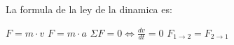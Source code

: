 
\question La formula de la ley de la dinamica es:

  \begin{oneparchoices}
    \choice $F=m \cdot v$
    \CorrectChoice $F=m \cdot a$
    \choice $\Sigma F = 0 \Leftrightarrow \frac{dv}{dt} = 0$
    \choice $F_{1 \rightarrow 2} = F_{2 \rightarrow 1}$
  \end{oneparchoices}
